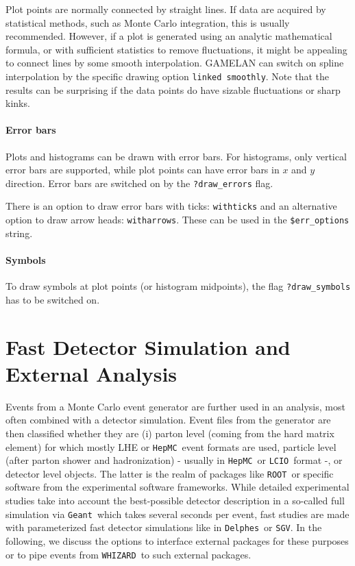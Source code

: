 \documentclass[12pt]{book}
\newcommand{\ttt}[1]{\texttt{#1}}
\newcommand{\whizard}{\ttt{WHIZARD}}
\newcommand{\lcio}{\ttt{LCIO}}
\newcommand{\hepmc}{\ttt{HepMC}}
\newcommand{\delphes}{\ttt{Delphes}}
\newcommand{\geant}{\ttt{Geant}}
\newcommand{\ROOT}{\ttt{ROOT}}
\begin{document}
Plot points are normally connected by straight lines.  If data are acquired by
statistical methods, such as Monte Carlo integration, this is usually
recommended.  However, if a plot is generated using an analytic mathematical
formula, or with sufficient statistics to remove fluctuations, it might be
appealing to connect lines by some smooth interpolation.  GAMELAN can switch
on spline interpolation by the specific drawing option \ttt{linked smoothly}.
Note that the results can be surprising if the data points do have sizable
fluctuations or sharp kinks.


\subsubsection{Error bars}

Plots and histograms can be drawn with error bars.  For histograms, only
vertical error bars are supported, while plot points can have error bars in
$x$ and $y$ direction.  Error bars are switched on by the \ttt{?draw\_errors}
flag.

There is an option to draw error bars with ticks: \ttt{withticks} and an
alternative option to draw arrow heads: \ttt{witharrows}.  These can be used
in the \ttt{\$err\_options} string.


\subsubsection{Symbols}

To draw symbols at plot points (or histogram midpoints), the flag
\ttt{?draw\_symbols} has to be switched on.


\chapter{Fast Detector Simulation and External Analysis}
\label{chap:ext_anal}

Events from a Monte Carlo event generator are further used in an
analysis, most often combined with a detector simulation. Event files
from the generator are then classified whether they are (i) parton
level (coming from the hard matrix element) for which mostly LHE or
\hepmc\ event formats are used, particle level (after parton shower
and hadronization) - usually in \hepmc\ or \lcio\ format -, or
detector level objects. The latter is the realm of packages like
\ROOT\ or specific software from the experimental software
frameworks. While detailed experimental studies take into account the
best-possible detector description in a so-called full simulation via
\geant\ which takes several seconds per event, fast studies are made
with parameterized fast detector simulations like in \delphes\ or
\texttt{SGV}. In the following, we discuss the options to interface
external packages for these purposes or to pipe events from
\whizard\ to such external packages.
\end{document}
